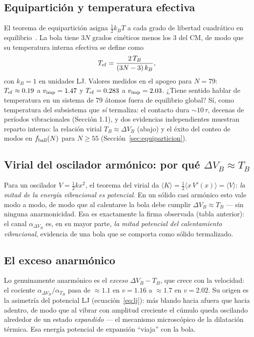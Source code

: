 \documentclass[11pt,a4paper]{article}
\newcommand{\kb}{k_B}
\begin{document}
\subsection{Equipartición y temperatura efectiva}
El teorema de equipartición asigna $\tfrac12\kb T$ a cada grado de libertad
cuadrático en equilibrio~\cite{Tolman1918,Reif1965}. La bola tiene $3N$
grados cinéticos menos los 3 del CM, de modo que su temperatura interna
efectiva se define como
\begin{equation}
T_{\rm ef} = \frac{2\,T_B}{(3N-3)\,\kb},
\end{equation}
con $\kb = 1$ en unidades LJ. Valores medidos en el apogeo para $N=79$:
$T_{\rm ef} \approx 0.19$ a $v_{\rm imp}=1.47$ y $T_{\rm ef} = 0.283$ a
$v_{\rm imp}=2.03$. ¿Tiene sentido hablar de temperatura en un sistema de
79 átomos fuera de equilibrio global? Sí, como temperatura del subsistema
que \emph{sí} termaliza: el contacto dura $\sim10\,\tau$, decenas de
períodos vibracionales (Sección 1.1), y dos evidencias independientes
muestran reparto interno: la relación virial $T_B \approx \Delta V_B$
(abajo) y el éxito del conteo de modos en $f_{\rm ball}(N)$ para $N\ge55$
(Sección~\ref{sec:equiparticion}).

\subsection{Virial del oscilador armónico: por qué $\Delta V_B \approx T_B$}
Para un oscilador $V = \tfrac12 k x^2$, el teorema del virial da
$\langle K \rangle = \tfrac12\langle x\,V'(x)\rangle = \langle V \rangle$:
\emph{la mitad de la energía vibracional es potencial}. En un sólido casi
armónico esto vale modo a modo, de modo que al calentarse la bola debe
cumplir $\Delta V_B \approx T_B$ --- sin ninguna anarmonicidad. Esa es
exactamente la firma observada (tabla anterior): el canal
$\alpha_{\Delta V_B}$ es, en su mayor parte, \emph{la mitad potencial del
calentamiento vibracional}, evidencia de una bola que se comporta como
sólido termalizado.

\subsection{El exceso anarmónico}
Lo genuinamente anarmónico es el \emph{exceso} $\Delta V_B - T_B$, que
crece con la velocidad: el cociente $\alpha_{\Delta V_B}/\alpha_{T_B}$ pasa
de $\approx1.1$ en $v=1.16$ a $\approx1.7$ en $v=2.02$. Su origen es la
asimetría del potencial LJ (ecuación~\ref{eq:lj}): más blando hacia afuera
que hacia adentro, de modo que al vibrar con amplitud creciente el cúmulo
queda oscilando alrededor de un estado \emph{expandido} --- el mecanismo
microscópico de la dilatación térmica. Esa energía potencial de expansión
``viaja'' con la bola.
\end{document}
